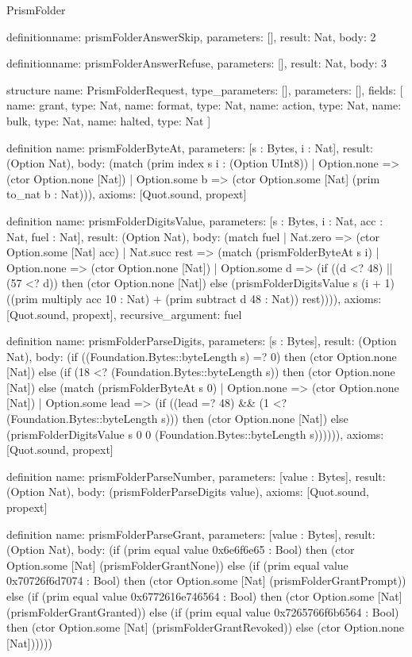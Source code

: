 \begin{lexlean}{PrismFolder}
\begin{semanticmodule}
definition{name: prismFolderAnswerSkip, parameters: [], result: Nat, body: 2}

definition{name: prismFolderAnswerRefuse, parameters: [], result: Nat, body: 3}

structure{
  name: PrismFolderRequest,
  type_parameters: [],
  parameters: [],
  fields: [
    {name: grant, type: Nat},
    {name: format, type: Nat},
    {name: action, type: Nat},
    {name: bulk, type: Nat},
    {name: halted, type: Nat}
  ]
}

definition{
  name: prismFolderByteAt,
  parameters: [s : Bytes, i : Nat],
  result: (Option Nat),
  body: (match (prim index s i : (Option UInt8))
    | Option.none => (ctor Option.none [Nat])
    | Option.some b => (ctor Option.some [Nat] (prim to_nat b : Nat))),
  axioms: [Quot.sound, propext]
}

definition{
  name: prismFolderDigitsValue,
  parameters: [s : Bytes, i : Nat, acc : Nat, fuel : Nat],
  result: (Option Nat),
  body: (match fuel
    | Nat.zero => (ctor Option.some [Nat] acc)
    | Nat.succ rest => (match (prismFolderByteAt s i)
      | Option.none => (ctor Option.none [Nat])
      | Option.some d => (if ((d <? 48) || (57 <? d)) then (ctor Option.none [Nat]) else (prismFolderDigitsValue s (i + 1) ((prim multiply acc 10 : Nat) + (prim subtract d 48 : Nat)) rest)))),
  axioms: [Quot.sound, propext],
  recursive_argument: fuel
}

definition{
  name: prismFolderParseDigits,
  parameters: [s : Bytes],
  result: (Option Nat),
  body: (if ((Foundation.Bytes::byteLength s) =? 0) then (ctor Option.none [Nat]) else (if (18 <? (Foundation.Bytes::byteLength s)) then (ctor Option.none [Nat]) else (match (prismFolderByteAt s 0)
    | Option.none => (ctor Option.none [Nat])
    | Option.some lead => (if ((lead =? 48) && (1 <? (Foundation.Bytes::byteLength s))) then (ctor Option.none [Nat]) else (prismFolderDigitsValue s 0 0 (Foundation.Bytes::byteLength s)))))),
  axioms: [Quot.sound, propext]
}

definition{
  name: prismFolderParseNumber,
  parameters: [value : Bytes],
  result: (Option Nat),
  body: (prismFolderParseDigits value),
  axioms: [Quot.sound, propext]
}

definition{
  name: prismFolderParseGrant,
  parameters: [value : Bytes],
  result: (Option Nat),
  body: (if (prim equal value 0x6e6f6e65 : Bool) then (ctor Option.some [Nat] (prismFolderGrantNone)) else (if (prim equal value 0x70726f6d7074 : Bool) then (ctor Option.some [Nat] (prismFolderGrantPrompt)) else (if (prim equal value 0x6772616e746564 : Bool) then (ctor Option.some [Nat] (prismFolderGrantGranted)) else (if (prim equal value 0x7265766f6b6564 : Bool) then (ctor Option.some [Nat] (prismFolderGrantRevoked)) else (ctor Option.none [Nat])))))
}


\end{semanticmodule}
\end{lexlean}
